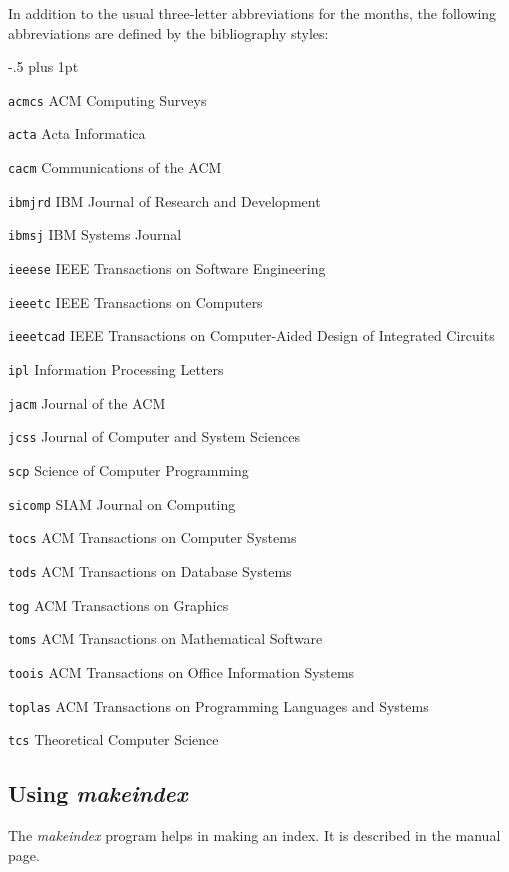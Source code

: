 \documentclass{article}
\begin{document}
In addition to the usual three-letter abbreviations for the months, the
following abbreviations are defined by the bibliography styles:
\begin{list}{}{ \itemindent-.5\leftmargin
       \itemsep=2pt plus 1pt
       \let\makelabel\descriptionlabel}\it
\item[\tt acmcs] ACM Computing Surveys
\item[\tt acta] Acta Informatica
\item[\tt cacm] Communications of the ACM
\item[\tt ibmjrd] IBM Journal of Research and Development
\item[\tt ibmsj] IBM Systems Journal
\item[\tt ieeese] IEEE Transactions on Software Engineering
\item[\tt ieeetc] IEEE Transactions on Computers
\item[\tt ieeetcad]
 IEEE Transactions on Computer-Aided Design of Integrated Circuits
\item[\tt ipl] Information Processing Letters
\item[\tt jacm] Journal of the ACM
\item[\tt jcss] Journal of Computer and System Sciences
\item[\tt scp] Science of Computer Programming
\item[\tt sicomp] SIAM Journal on Computing
\item[\tt tocs] ACM Transactions on Computer Systems
\item[\tt tods] ACM Transactions on Database Systems
\item[\tt tog] ACM Transactions on Graphics
\item[\tt toms] ACM Transactions on Mathematical Software
\item[\tt toois] ACM Transactions on Office Information Systems
\item[\tt toplas] ACM Transactions on Programming Languages and Systems
\item[\tt tcs] Theoretical Computer Science
\end{list}


\subsection{Using {\em makeindex\/}} \label{sec:makeindex}

The {\em makeindex\/} program helps in making an index.  It is 
described in the manual page.
\end{document}
